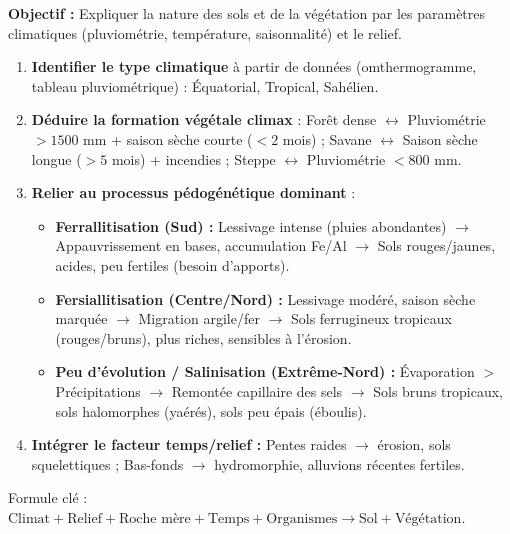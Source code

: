 \documentclass[11pt]{article}
\newcommand{\cle}[1]{{\popxbold\color{popdark}#1}}
\begin{document}
\begin{methode}
\textbf{Objectif :} Expliquer la nature des sols et de la végétation par les paramètres climatiques (pluviométrie, température, saisonnalité) et le relief.
\begin{enumerate}
    \item \textbf{Identifier le type climatique} à partir de données (omthermogramme, tableau pluviométrique) : Équatorial, Tropical, Sahélien.
    \item \textbf{Déduire la formation végétale climax} : Forêt dense $\leftrightarrow$ Pluviométrie $> 1500$ mm + saison sèche courte ($< 2$ mois) ; Savane $\leftrightarrow$ Saison sèche longue ($> 5$ mois) + incendies ; Steppe $\leftrightarrow$ Pluviométrie $< 800$ mm.
    \item \textbf{Relier au processus pédogénétique dominant} :
    \begin{itemize}
        \item \textbf{Ferrallitisation (Sud) :} Lessivage intense (pluies abondantes) $\rightarrow$ Appauvrissement en bases, accumulation Fe/Al $\rightarrow$ Sols rouges/jaunes, acides, peu fertiles (besoin d'apports).
        \item \textbf{Fersiallitisation (Centre/Nord) :} Lessivage modéré, saison sèche marquée $\rightarrow$ Migration argile/fer $\rightarrow$ Sols ferrugineux tropicaux (rouges/bruns), plus riches, sensibles à l'érosion.
        \item \textbf{Peu d'évolution / Salinisation (Extrême-Nord) :} Évaporation $>$ Précipitations $\rightarrow$ Remontée capillaire des sels $\rightarrow$ Sols bruns tropicaux, sols halomorphes (yaérés), sols peu épais (éboulis).
    \end{itemize}
    \item \textbf{Intégrer le facteur temps/relief :} Pentes raides $\rightarrow$ érosion, sols squelettiques ; Bas-fonds $\rightarrow$ hydromorphie, alluvions récentes fertiles.
\end{enumerate}
\cle{Formule clé} : $\text{Climat} + \text{Relief} + \text{Roche mère} + \text{Temps} + \text{Organismes} \rightarrow \text{Sol} + \text{Végétation}$.
\end{methode}
\end{document}
